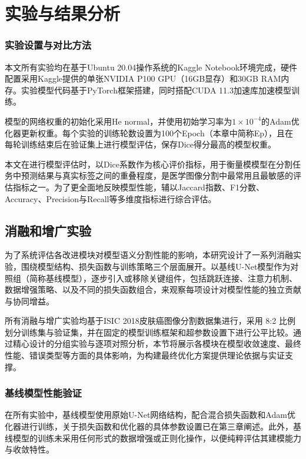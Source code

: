 \section{实验与结果分析}

\subsubsection{实验设置与对比方法}

本文所有实验均在基于Ubuntu 20.04操作系统的Kaggle Notebook环境完成，硬件配置采用Kaggle提供的单张NVIDIA P100 GPU（16GB显存）和30GB RAM内存。实验模型代码基于PyTorch框架搭建，同时搭配CUDA 11.3加速库加速模型训练。

模型的网络权重的初始化采用He normal，并使用初始学习率为$1 \times 10^{-4}$的Adam优化器更新权重。每个实验的训练轮数设置为100个Epoch（本章中简称Ep），且在每轮训练结束后在验证集上进行模型评估，保存Dice得分最高的模型权重。

本文在进行模型评估时，以Dice系数作为核心评价指标，用于衡量模模型在分割任务中预测结果与真实标签之间的重叠程度，是医学图像分割中最常用且最敏感的评估指标之一。为了更全面地反映模型性能，辅以Jaccard指数、F1分数、Accuracy、Precision与Recall等多维度指标进行综合评估。

\subsection{消融和增广实验}

为了系统评估各改进模块对模型语义分割性能的影响，本研究设计了一系列消融实验，围绕模型结构、损失函数与训练策略三个层面展开。以基线U-Net模型作为对照组（简称基线模型），逐步引入或移除关键组件，包括跳跃连接、注意力机制、数据增强策略、以及不同的损失函数组合，来观察每项设计对模型性能的独立贡献与协同增益。

所有消融与增广实验均基于ISIC 2018皮肤癌图像分割数据集进行，采用 8:2 比例划分训练集与验证集，并在固定的模型训练框架和超参数设置下进行公平比较。通过精心设计的分组实验与逐项对照分析，本节将展示各模块在模型收敛速度、最终性能、错误类型等方面的具体影响，为构建最终优化方案提供理论依据与实证支撑。

\subsubsection{基线模型性能验证}

在所有实验中，基线模型使用原始U-Net网络结构，配合混合损失函数和Adam优化器进行训练，关于损失函数和优化器的具体参数设置已在第三章阐述。此外，基线模型的训练未采用任何形式的数据增强或正则化操作，以便纯粹评估其建模能力与收敛特性。

